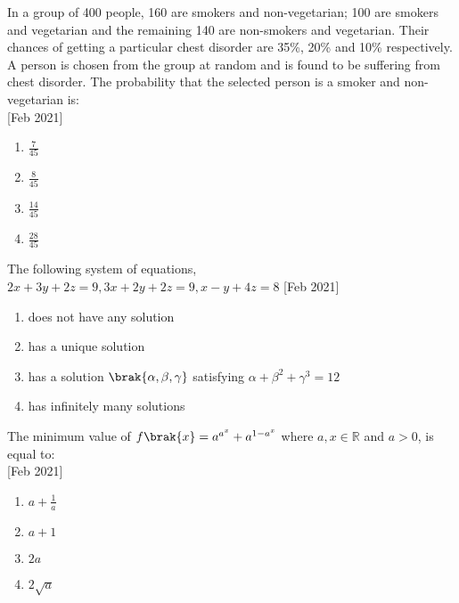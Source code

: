     \item{
            In a group of 400 people, 160 are smokers and non-vegetarian; 100 are smokers and vegetarian and the remaining 140 are non-smokers and vegetarian. Their chances of getting a particular chest disorder are 35\%, 20\% and 10\% respectively. A person is chosen from the group at random and is found to be suffering from chest disorder. The probability that the selected person is a smoker and non-vegetarian is: \\ \text{ }
             \hfill
                {[Feb 2021]}
			\begin{multicols}{4}
				\begin{enumerate}
					\item $\frac{7}{45}$  
					\item $\frac{8}{45}$  
					\item $\frac{14}{45}$  
					\item $\frac{28}{45}$
				\end{enumerate}
			\end{multicols}
        
        }
    \item{
        	The following system of equations,
            $
            	2x + 3y + 2z = 9 ,
            	3x + 2y + 2z = 9 ,
            	x - y + 4z = 8
            $
             \text{   }\hfill
                {[Feb 2021]}

                \begin{enumerate}
                   	\item does not have any solution 
                   	\item has a unique solution 
                   	\item has a solution $\brak{\alpha, \beta, \gamma}$ satisfying $\alpha + \beta^2 + \gamma^3 = 12$ 
                   	\item has infinitely many solutions
                \end{enumerate}

        
        }
    \item{
	
			The minimum value of
			$ f\brak{x} = a^{a^{x}} + a^{1-a^{x}}$
			where $a, x \in \mathbb{R}$ and $a > 0$, is equal to:\\
			\text{   }\hfill
			{[Feb 2021]}
			\begin{multicols}{4}
				\begin{enumerate}
						\item $a + \frac{1}{a}$
						\item $a + 1$
						\item $2a$
						\item $2\sqrt{a}$
				\end{enumerate}
			\end{multicols}
			
		}
